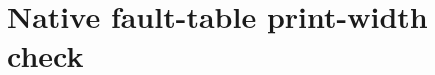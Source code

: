 \documentclass[conference,10pt]{IEEEtran}
\begin{document}
\onecolumn
\section*{Native fault-table print-width check}
\noindent
\begingroup\small
\setlength{\tabcolsep}{3pt}

\endgroup
\end{document}
